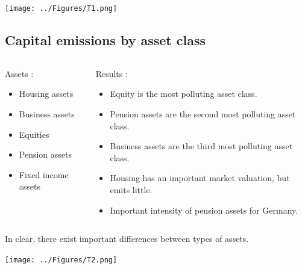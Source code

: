 \documentclass[10pt]{beamer}
\newcommand\ReduceFont{\fontsize{10}{7.2}\selectfont}
\begin{document}
\begin{frame}{\subsecname}
    \begin{center}
        \texttt{[image: ../Figures/T1.png]}    
    \end{center}
\end{frame}

\subsection{Capital emissions by asset class}

\begin{frame}{\subsecname}
    \begin{columns}
        \begin{column}{0.5\textwidth}
            Assets :
                \begin{itemize} 
                    \item Housing assets
                    \item Business assets
                    \item Equities 
                    \item Pension assets
                    \item Fixed income assets
                \end{itemize}
        \end{column}
        \begin{column}{0.5\textwidth}
            \ReduceFont
            Results : 
                \begin{itemize}
                    \item Equity is the most polluting asset class.
                    \item Pension assets are the second most polluting asset class.
                    \item Business assets are the third most polluting asset class.
                    \item Housing has an important market valuation, but emits little.
                    \item Important intensity of pension assets for Germany.
                \end{itemize}    
        \end{column}
    \end{columns}
    \hfill \break
    In clear, there exist important differences between types of assets.
\end{frame}

\begin{frame}{\subsecname}
    \begin{center}
        \texttt{[image: ../Figures/T2.png]}    
    \end{center}
\end{frame}
\end{document}
